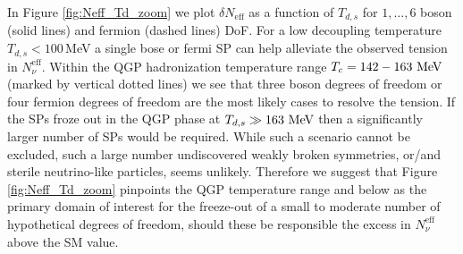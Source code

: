 In Figure \ref{fig:Neff_Td_zoom} we plot $\delta N_{\text{eff}}$ as a function of $T_{d,s}$ for $1,\dots,6$ boson (solid lines) and fermion (dashed lines) DoF. For a low decoupling temperature $T_{d,s}<100$\,MeV a single bose or fermi SP can help alleviate the observed tension in $N^{\text{eff}}_{\nu}$. Within the QGP hadronization temperature range $T_c=142-163\text{ MeV}$ (marked by vertical dotted lines) we see that three boson degrees of freedom or four fermion degrees of freedom are the most likely cases to resolve the tension. If the SPs froze out in the QGP phase at $T_{d,s}\gg 163\text{ MeV}$ then a significantly larger number of SPs would be required. While such a scenario cannot be excluded, such a large number undiscovered weakly broken symmetries, or/and sterile neutrino-like particles, seems unlikely. Therefore we suggest that Figure \ref{fig:Neff_Td_zoom} pinpoints the QGP temperature range and below as the primary domain of interest for the freeze-out of a small to moderate number of hypothetical degrees of freedom, should these be responsible the excess in $N_\nu^{\text{eff}}$ above the SM value.





